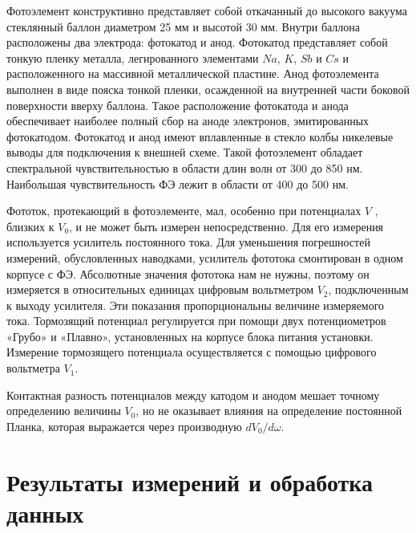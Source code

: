 \documentclass[a4paper, 12pt]{article}
\begin{document}
Фотоэлемент конструктивно представляет собой откачанный до высокого вакуума стеклянный баллон диаметром 25 мм и высотой 30 мм.
Внутри баллона расположены два электрода: фотокатод и анод. Фотокатод представляет собой тонкую пленку металла, легированного элементами $Na$, $K$, $Sb$ и $Cs$ и расположенного на массивной металлической
пластине. Анод фотоэлемента выполнен в виде пояска тонкой пленки,
осажденной на внутренней части боковой поверхности вверху баллона.
Такое расположение фотокатода и анода обеспечивает наиболее полный
сбор на аноде электронов, эмитированных фотокатодом. Фотокатод и
анод имеют вплавленные в стекло колбы никелевые выводы для подключения к внешней схеме. Такой фотоэлемент обладает спектральной
чувствительностью в области длин волн от 300 до 850 нм. Наибольшая
чувствительность ФЭ лежит в области от 400 до 500 нм.

Фототок, протекающий в фотоэлементе, мал, особенно при потенциалах $V$ , близких к $V_0$, и не может быть измерен непосредственно. Для
его измерения используется усилитель постоянного тока. Для уменьшения погрешностей измерений, обусловленных наводками, усилитель
фототока смонтирован в одном корпусе с ФЭ. Абсолютные значения фототока нам не нужны, поэтому он измеряется в относительных единицах цифровым вольтметром $V_2$, подключенным к выходу усилителя.
Эти показания пропорциональны величине измеряемого тока. Тормозящий потенциал регулируется при помощи двух потенциометров «Грубо»
и «Плавно», установленных на корпусе блока питания установки. Измерение тормозящего потенциала осуществляется с помощью цифрового
вольтметра $V_1$.

Контактная разность потенциалов между катодом и анодом мешает
точному определению величины $V_0$, но не оказывает влияния на определение постоянной Планка, которая выражается через производную
$dV_0/d\omega$.

%

\section{Результаты измерений и обработка данных}
\end{document}
